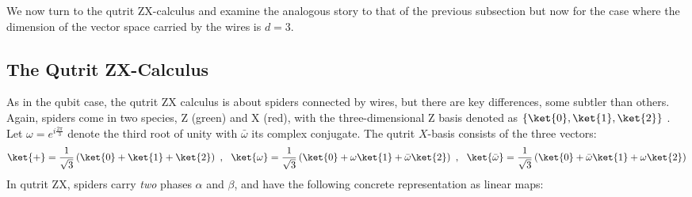 \documentclass[submission,copyright,creativecommons]{eptcs}
\begin{document}
We now turn to the qutrit ZX-calculus and examine the analogous story to that of the previous subsection
but now for the case where the dimension of the vector space carried by the wires is $d=3$.


\subsection{The Qutrit ZX-Calculus}


As in the qubit case, the qutrit ZX calculus is about spiders connected by wires, but there are key differences, some subtler than others.
Again, spiders come in two species, Z (green) and X (red),
with the three-dimensional Z basis denoted as $\{\ket{0},\ket{1},\ket{2}\}$ .
Let $\omega = e^{i \frac{2\pi}{3}}$ denote the third root of unity
with $\bar\omega$ its complex conjugate.
The qutrit $X$-basis consists of the three vectors: 
\begin{equation}
	\ket{+} = \frac{1}{\sqrt{3}} \left(\ket{0} + \ket{1} + \ket{2}\right)~,~~
	\ket{\omega} = \frac{1}{\sqrt{3}} \left(\ket{0} + \omega\ket{1} + \bar{\omega}\ket{2}\right)~,~~
	\ket{\bar{\omega}} = \frac{1}{\sqrt{3}} \left(\ket{0} + \bar{\omega}\ket{1} + \omega\ket{2}\right)
\end{equation}
In qutrit ZX,
spiders carry \textit{two} phases $\alpha$ and $\beta$,
and have the following concrete representation as linear maps:
\begingroup
	\allowdisplaybreaks
	\setlength{\jot}{10pt}
\end{document}
